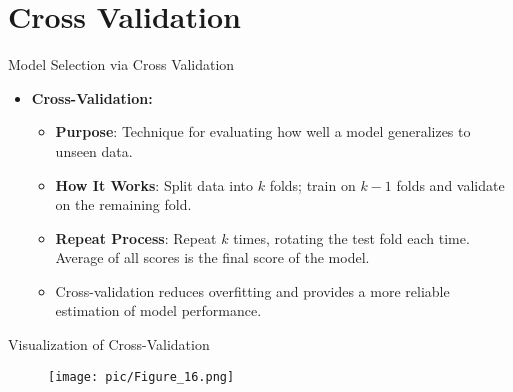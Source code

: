 \documentclass[serif, aspectratio=169]{beamer}
\begin{document}
\section{Cross Validation}

\begin{frame}{Model Selection via Cross Validation}
    \begin{itemize}
        \item \textbf{Cross-Validation:}
        \medskip
        \begin{itemize}\itemsep1em
            \item \justifying \textbf{Purpose}:
            Technique for evaluating how well a model generalizes to unseen data.
            \item \justifying \textbf{How It Works}:
            Split data into $k$ folds; train on $k-1$ folds and validate on the remaining fold.
            \item \justifying \textbf{Repeat Process}:
            Repeat $k$ times, rotating the test fold each time. Average of all scores is the final score of the model.
            \item \justifying Cross-validation
            reduces overfitting and provides a more reliable estimation of model performance.
        \end{itemize}
    \end{itemize}
\end{frame}

\begin{frame}{Visualization of Cross-Validation}
    \begin{figure}
        \centering
        \texttt{[image: pic/Figure\_16.png]}
    \end{figure}
\end{frame}
\end{document}
